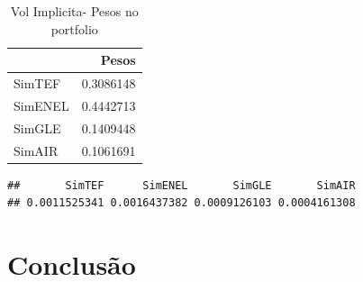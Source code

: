 \documentclass[
  12pt,
  a4paper,
  openany]{book}
\newenvironment{Shaded}{\begin{snugshade}}{\end{snugshade}}
\newcommand{\DataTypeTok}[1]{\textcolor[rgb]{0.13,0.29,0.53}{#1}}
\newcommand{\DecValTok}[1]{\textcolor[rgb]{0.00,0.00,0.81}{#1}}
\newcommand{\FloatTok}[1]{\textcolor[rgb]{0.00,0.00,0.81}{#1}}
\newcommand{\KeywordTok}[1]{\textcolor[rgb]{0.13,0.29,0.53}{\textbf{#1}}}
\newcommand{\NormalTok}[1]{#1}
\newcommand{\OperatorTok}[1]{\textcolor[rgb]{0.81,0.36,0.00}{\textbf{#1}}}
\newcommand{\StringTok}[1]{\textcolor[rgb]{0.31,0.60,0.02}{#1}}
\begin{document}
\normalsize

\begin{table}[!h]

\caption{\label{tab:unnamed-chunk-65}Vol Implicita- Pesos no portfolio}
\centering
\begin{tabular}[t]{lr}
\toprule
  & Pesos\\
\midrule
SimTEF & 0.3086148\\
SimENEL & 0.4442713\\
SimGLE & 0.1409448\\
SimAIR & 0.1061691\\
\bottomrule
\end{tabular}
\end{table}

\scriptsize

\begin{Shaded}
\end{Shaded}

\begin{verbatim}
##       SimTEF      SimENEL       SimGLE       SimAIR 
## 0.0011525341 0.0016437382 0.0009126103 0.0004161308
\end{verbatim}

\begin{Shaded}
\end{Shaded}

\normalsize

\hypertarget{conclusuxe3o}{%
\chapter*{Conclusão}\label{conclusuxe3o}}
\end{document}
